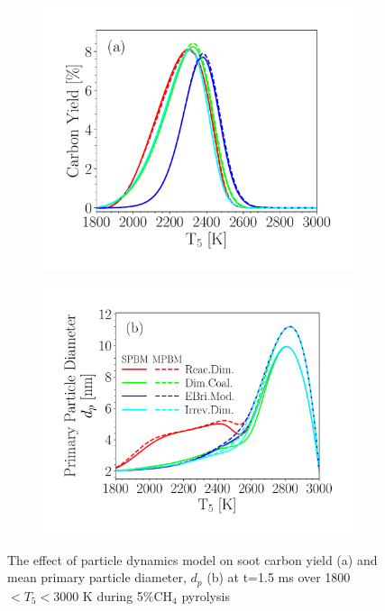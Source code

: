 \begin{figure}[H]
	\centering
	\begin{subfigure}[t]{0.4\textwidth}
		\includegraphics[width=1\textwidth]{Figures/Results/Shocktube/Agafonov2016_cvr/carbon_yield_pdynamiceffect.pdf}
	\end{subfigure}
	\begin{subfigure}[t]{0.435\textwidth}
		\includegraphics[width=1\textwidth]{Figures/Results/Shocktube/Agafonov2016_cvr/d_p_pdynamiceffect.pdf}
	\end{subfigure}
	\caption{The effect of particle dynamics model on soot carbon yield (a) and mean primary particle diameter, $d_p$ (b) at t=1.5 ms over 1800$<T_5<$3000 K during 5\%$\mathrm{CH_4}$ pyrolysis~\citep{agafonov2016unified}}
	\label{fig:shockagof_pdynamiceffect} 
\end{figure}
